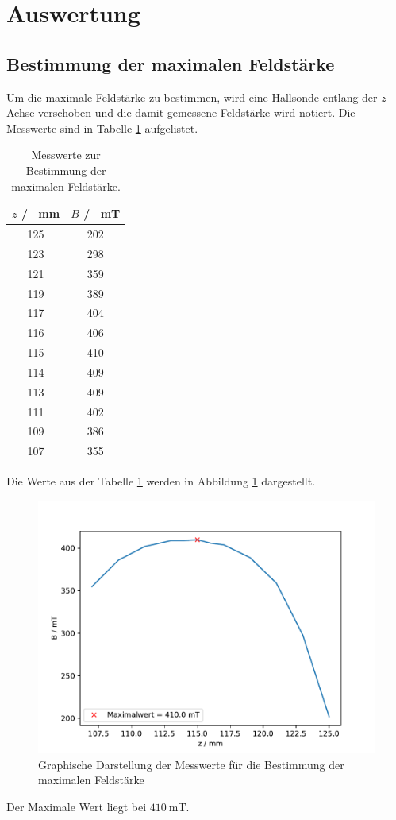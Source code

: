 \section{Auswertung}
\label{sec:Auswertung}
\subsection{Bestimmung der maximalen Feldstärke}
Um die maximale Feldstärke zu bestimmen, wird eine Hallsonde entlang der $z$-Achse verschoben und die damit gemessene 
Feldstärke wird notiert.
Die Messwerte sind in Tabelle \ref{tab:Feldstärke} aufgelistet.
\FloatBarrier
\begin{table}
  \centering
  \begin{tabular}{c c}
    \toprule
    $z$ / \SI{}{\milli\meter}& $B$ / \SI{}{\milli\tesla}\\
    \midrule
    125& 202\\     
    123& 298\\
    121& 359\\
    119& 389\\
    117& 404\\
    116& 406\\
    115& 410\\
    114& 409\\
    113& 409\\
    111& 402\\
    109& 386\\
    107& 355\\
    \bottomrule
  \end{tabular}
  \caption{Messwerte zur Bestimmung der maximalen Feldstärke.}
  \label{tab:Feldstärke}
\end{table}
\FloatBarrier
Die Werte aus der Tabelle \ref{tab:Feldstärke} werden in Abbildung \ref{fig:Feldstärke} dargestellt.
\FloatBarrier
\begin{figure}
  \centering
  \includegraphics[width = \textwidth, keepaspectratio]{figure/BFeld_plot.pdf}
  \caption{Graphische Darstellung der Messwerte für die Bestimmung der maximalen Feldstärke}
  \label{fig:Feldstärke}
\end{figure}
\FloatBarrier
Der Maximale Wert liegt bei $\SI{410}{\milli\tesla}$. 
